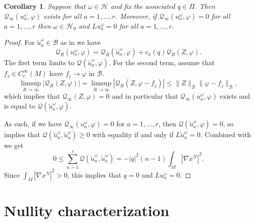 \documentclass[11pt]{amsart}
\numberwithin{equation}{section}
\theoremstyle{plain}
\newtheorem{corollary}[corollary]{Corollary}
\theoremstyle{definition}
\theoremstyle{remark}
\newcommand{\Hcal}{\mathcal H}
\newcommand{\Qcal}{\mathcal Q}
\newcommand{\Bcal}{\mathcal B}
\begin{document}
\begin{corollary}\label{cor:u-a-sum-nullity}
Suppose that $\omega \in \Hcal$ and fix the associated $q \in \Pi$. Then $\Qcal_\infty(u^\omega_a,\varphi)$ exists for all $a=1,\dots,r$. Moreover, if  $\Qcal_\infty(u^\omega_a,\varphi) = 0$ for all $a =1,\dots,r$ then $\omega \in \Hcal_0$ and $L u^\omega_a = 0$ for all $a = 1,\dots,r$. 
\end{corollary}
\begin{proof}
For $\tilde u^\omega_a \in \Bcal$ as in  we have
\[
\Qcal_R(u^\omega_a,\varphi) = \Qcal_R(\tilde u^\omega_a,\varphi) + c_a(q) \Qcal_R(Z,\varphi). 
\]
The first term limits to $\Qcal(\tilde u_a^\omega,\varphi)$. For the second term, assume that $f_j \in C^\infty_c(M)$ have $f_j \to \varphi$ in $\Bcal$. 
\[
\limsup_{R\to\infty} |\Qcal_R(Z,\varphi)| = \limsup_{R\to\infty} |\Qcal_R(Z,\varphi - f_j)| \leq \|Z\|_\Bcal \|\varphi - f_j\|_\Bcal,
\]
which implies that $\Qcal_\infty(Z,\varphi) = 0$ and in particular that $\Qcal_\infty(u^\omega_a,\varphi)$ exists and is equal to $\Qcal(\tilde u^\omega_a,\varphi)$.  

As such, if we have  $\Qcal_\infty(u^\omega_a,\varphi)=0$ for $a=1,\dots,r$, then $\Qcal(\tilde u^\omega_a,\varphi) = 0$, so  implies that $\Qcal(\tilde u^\omega_a,\tilde u^\omega_a) \geq 0$ with equality if and only if $L\tilde u^\omega_a = 0$. Combined with  we get
\[
0 \leq \sum_{a=1}^r \Qcal(\tilde u_a^\omega,\tilde u_a^\omega) = -  |q|^2(n-1) \int_{M} |\nabla x^N|^2. 
\]
Since $\int_M |\nabla x^N|^2>0$, this implies that $q=0$ and $Lu^\omega_a =0$.
\end{proof}


\section{Nullity characterization}\label{sec:nullity}
\end{document}
